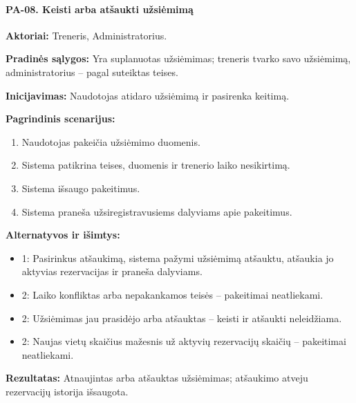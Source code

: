 \paragraph{PA-08. Keisti arba atšaukti užsiėmimą}\mbox{}\par
\textbf{Aktoriai:} Treneris, Administratorius.\par
\textbf{Pradinės sąlygos:} Yra suplanuotas užsiėmimas; treneris tvarko savo užsiėmimą, administratorius -- pagal suteiktas teises.\par
\textbf{Inicijavimas:} Naudotojas atidaro užsiėmimą ir pasirenka keitimą.\par
\textbf{Pagrindinis scenarijus:}
\begin{enumerate}
\item Naudotojas pakeičia užsiėmimo duomenis.
\item Sistema patikrina teises, duomenis ir trenerio laiko nesikirtimą.
\item Sistema išsaugo pakeitimus.
\item Sistema praneša užsiregistravusiems dalyviams apie pakeitimus.
\end{enumerate}
\textbf{Alternatyvos ir išimtys:}
\begin{itemize}
\item 1: Pasirinkus atšaukimą, sistema pažymi užsiėmimą atšauktu, atšaukia jo aktyvias rezervacijas ir praneša dalyviams.
\item 2: Laiko konfliktas arba nepakankamos teisės -- pakeitimai neatliekami.
\item 2: Užsiėmimas jau prasidėjo arba atšauktas -- keisti ir atšaukti neleidžiama.
\item 2: Naujas vietų skaičius mažesnis už aktyvių rezervacijų skaičių -- pakeitimai neatliekami.
\end{itemize}
\textbf{Rezultatas:} Atnaujintas arba atšauktas užsiėmimas; atšaukimo atveju rezervacijų istorija išsaugota.\par
\clearpage
